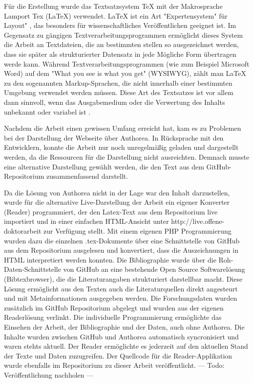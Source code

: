 Für die Erstellung wurde das Textsatzsystem TeX mit der Makrosprache Lamport Tex (LaTeX) verwendet. LaTeX ist ein Art "Expertensystem" für Layout" \cite{suchen}, das besonders für wissenschaftliches Veröffentlichen geeignet ist. Im Gegensatz zu gängigen Textverarbeitungsprogrammen ermöglicht dieses System die Arbeit an Textdateien, die an bestimmten stellen so ausgezeichnet werden, dass sie später als strukturierter Datensatz in jede Mögliche Form übertragen werde kann. Während Textverarbeitungsprogrammen (wie zum Beispiel Microsoft Word) auf dem "What you see is what you get" (WYSIWYG), zählt man LaTeX zu den sogenannten Markup-­Sprachen, die nicht innerhalb einer bestimmten Umgebung verwendet werden müssen. Diese Art des Textsatzes ist vor allem dann sinnvoll, wenn das Ausgabemedium oder die Verwertung des Inhalts unbekannt oder variabel ist \cite{suchen}.

Nachdem die Arbeit einen gewissen Umfang erreicht hat, kam es zu Problemen bei der Darstellung der Webseite über Authorea. In Rücksprache mit den Entwicklern, konnte die Arbeit nur noch unregelmäßig geladen und dargestellt werden, da die Ressourcen für die Darstellung nicht ausreichten. Demnach musste eine alternative Darstellung gewählt werden, die den Text aus dem GitHub-Repositorium zusammenfassend darstellt.

Da die Lösung von Authorea nicht in der Lage war den Inhalt darzustellen, wurde für die alternative Live-Darstellung der Arbeit ein eigener Konverter (Reader) programmiert, der den Latex-Text aus dem Repositorium live importiert und in einer einfachen HTML-Ansicht unter http://live.offene-doktorarbeit zur Verfügung stellt. Mit einem eigenen PHP Programmierung wurden dazu die einzelnen .tex-Dokumente über eine Schnittstelle von GitHub aus dem Repositorium ausgelesen und konvertiert, dass die Auszeichnungen in HTML interpretiert werden konnten. Die Bibliographie wurde über die Roh-Daten-Schnittstelle von GitHub an eine bestehende Open Source Softwarelösung (Bibtexbrowser), die die Literaturangaben strukturiert darstellbar macht. Diese Lösung ermöglicht aus den Texten auch die Literaturquellen direkt angesteurt und mit Metainformationen ausgegeben werden. Die Forschungsdaten wurden zusätzlich im GitHub Repositorium abgelegt und wurden aus der eigenen Readerlösung verlinkt. Die individuelle Programmierung ermöglichte das Einsehen der Arbeit, der Bibliographie und der Daten, auch ohne Authorea. Die Inhalte wurden zwischen GitHub und Authorea automatisch syncronisiert und waren stehts aktuell. Der Reader ermöglichte es jederzeit auf den aktuellen Stand der Texte und Daten zuzugreifen. Der Quellcode für die Reader-Applikation wurde ebenfalls im Repositorium zu dieser Arbeit veröffentlicht. --- Todo: Veröffentlichung nachholen ---

